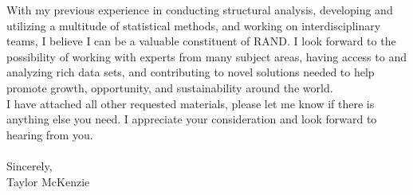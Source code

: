 \documentclass[]{article}
\begin{document}
With my previous experience in conducting structural analysis, developing and utilizing a multitude of statistical methods, and working on interdisciplinary teams, I believe I can be a valuable constituent of RAND. I look forward to the possibility of working with experts from many subject areas, having access to and analyzing rich data sets, and contributing to novel solutions needed to help promote growth, opportunity, and sustainability around the world.\\

I have attached all other requested materials, please let me know if there is anything else you need. I appreciate your consideration and look forward to hearing from you.\\\\

\noindent Sincerely,\\

\noindent Taylor McKenzie
\end{document}
